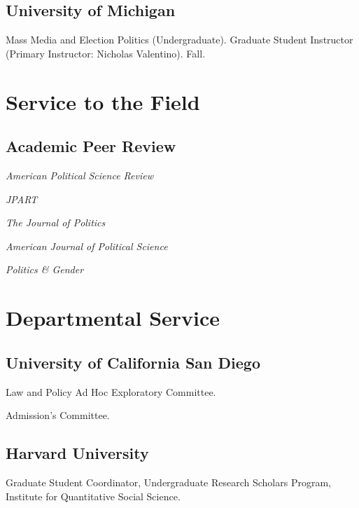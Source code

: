 \documentclass[12pt,letterpaper]{report}
\newcommand{\listitemspace}{0.25em}
\renewenvironment{itemize}
{\begin{list}{}{\setlength{\leftmargin}{0em}
                \setlength{\parskip}{0em}
                \setlength{\itemsep}{\listitemspace}
                \setlength{\parsep}{\listitemspace}}}
{\end{list}}
\newcommand{\tacourse}[5]{\item[#1] \tab{}#3 (#4). #5. #2.} %
\begin{document}
   \subsection*{University of Michigan}

   \begin{tablist}
    \tacourse{2013}{Fall}{Mass Media and Election Politics}{Undergraduate}{Graduate Student Instructor (Primary Instructor: Nicholas Valentino)}
    \end{tablist}
    
    
    \section*{Service to the Field}
    \subsection*{Academic Peer Review}
    
    \begin{itemize}
        \item[] \emph{American Political Science Review}
        \item[] \emph{JPART}
        \item[] \emph{The Journal of Politics}
        \item[] \emph{American Journal of Political Science}
        \item[] \emph{Politics \& Gender}
    \end{itemize}
    
    \section*{Departmental Service}
    
    \subsection*{University of California San Diego}
    \begin{tablist}
        \item[2021-] \tab{}Law and Policy Ad Hoc Exploratory Committee.
        \item[2020-] \tab{}Admission's Committee.
    \end{tablist}
    
    \subsection*{Harvard University}
    \begin{tablist}
        \item[2015-17] \tab{}Graduate Student Coordinator, Undergraduate Research Scholars Program, Institute for Quantitative Social Science.
    \end{tablist}
    
\end{document}
